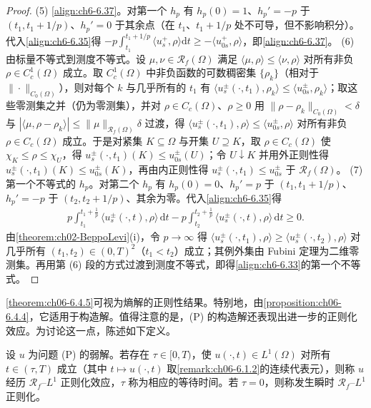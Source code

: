 \documentclass[../../main.tex]{subfiles}%
\begin{document}
\begin{proof}
(5) \eqref{align:ch6-6.37}。对第一个 $h_p$ 有 $h_p(0)=1$、$h_p'=-p$ 于 $(t_1,t_1+1/p)$、$h_p'=0$ 于其余点（在 $t_1$、$t_1+1/p$ 处不可导，但不影响积分）。代入\eqref{align:ch6-6.35}得 $-p\int_{t_1}^{t_1+1/p}\langle u^+_s,\rho\rangle\mathrm{d}t\geqslant-\langle u^+_{0s},\rho\rangle$，即\eqref{align:ch6-6.37}。
(6) 由标量不等式到测度不等式。设 $\mu,\nu\in\mathscr{R}_f(\Omega)$ 满足 $\langle\mu,\rho\rangle\leqslant\langle\nu,\rho\rangle$ 对所有非负 $\rho\in C^1_c(\Omega)$ 成立。取 $C^1_c(\Omega)$ 中非负函数的可数稠密集 $\{\rho_k\}$（相对于 $\|\cdot\|_{C_0(\Omega)}$），则对每个 $k$ 与几乎所有的 $t_1$ 有 $\langle u^\pm_s(\cdot,t_1),\rho_k\rangle\leqslant\langle u^\pm_{0s},\rho_k\rangle$；取这些零测集之并（仍为零测集），并对 $\rho\in C_c(\Omega)$、$\rho\geqslant0$ 用 $\|\rho-\rho_k\|_{C_0(\Omega)}<\delta$ 与 $|\langle\mu,\rho-\rho_k\rangle|\leqslant\|\mu\|_{\mathscr{R}_f(\Omega)}\delta$ 过渡，得 $\langle u^\pm_s(\cdot,t_1),\rho\rangle\leqslant\langle u^\pm_{0s},\rho\rangle$ 对所有非负 $\rho\in C_c(\Omega)$ 成立。于是对紧集 $K\subseteq\Omega$ 与开集 $U\supseteq K$，取 $\rho\in C_c(\Omega)$ 使 $\chi_K\leqslant\rho\leqslant\chi_U$，得 $u^\pm_s(\cdot,t_1)(K)\leqslant u^\pm_{0s}(U)$；令 $U\downarrow K$ 并用外正则性得 $u^\pm_s(\cdot,t_1)(K)\leqslant u^\pm_{0s}(K)$，再由内正则性得 $u^\pm_s(\cdot,t_1)\leqslant u^\pm_{0s}$ 于 $\mathscr{R}_f(\Omega)$。
(7) 第一个不等式的 $h_p$。对第二个 $h_p$ 有 $h_p(0)=0$、$h_p'=p$ 于 $(t_1,t_1+1/p)$、$h_p'=-p$ 于 $(t_2,t_2+1/p)$、其余为零。代入\eqref{align:ch6-6.35}得
\begin{align*}
p\int_{t_1}^{t_1+\frac{1}{p}}\langle u^\pm_s(\cdot,t),\rho\rangle\,\mathrm{d}t
-p\int_{t_2}^{t_2+\frac{1}{p}}\langle u^\pm_s(\cdot,t),\rho\rangle\,\mathrm{d}t\geqslant0 .
\end{align*}
由\cref{theorem:ch02-BeppoLevi}(i)，令 $p\to\infty$ 得 $\langle u^\pm_s(\cdot,t_1),\rho\rangle\geqslant\langle u^\pm_s(\cdot,t_2),\rho\rangle$ 对几乎所有 $(t_1,t_2)\in(0,T)^2$（$t_1<t_2$）成立；其例外集由 Fubini 定理为二维零测集。再用第 (6) 段的方式过渡到测度不等式，即得\eqref{align:ch6-6.33}的第一个不等式。
\end{proof}

\cref{theorem:ch06-6.4.5}可视为熵解的正则性结果。特别地，由\cref{proposition:ch06-6.4.4}，它适用于构造解。值得注意的是，(P) 的构造解还表现出进一步的正则化效应。为讨论这一点，陈述如下定义。

\begin{definition}\label{definition:ch06-RfL1正则}
设 $u$ 为问题 (P) 的弱解。若存在 $\tau\in[0,T)$，使 $u(\cdot,t)\in L^1(\Omega)$ 对所有 $t\in(\tau,T)$ 成立（其中 $t\mapsto u(\cdot,t)$ 取\cref{remark:ch06-6.1.2}的连续代表元），则称 $u$ 经历 $\mathscr{R}_f$--$L^1$ 正则化效应，$\tau$ 称为相应的等待时间。若 $\tau=0$，则称发生瞬时 $\mathscr{R}_f$--$L^1$ 正则化。
\end{definition}
\end{document}
